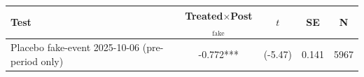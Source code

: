 \begin{tabular}{lcccc}
\toprule
Test & Treated$\times$Post$_{\text{fake}}$ & $t$ & SE & N \\
\midrule
Placebo fake-event 2025-10-06 (pre-period only) & -0.772*** & (-5.47) & 0.141 & 5967 \\
\bottomrule
\end{tabular}